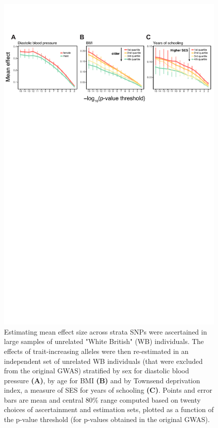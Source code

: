 \documentclass[hidelinks, 12pt]{article}
\begin{document}
\begin{figure}[h]
\centering
\includegraphics[width=\textwidth]{./supp_figures/beta_sweep.pdf}
\caption[Estimating mean effect size across strata]{\small Estimating mean effect size across strata   SNPs were ascertained in large samples of unrelated "White British" (WB) individuals. The effects of trait-increasing alleles were then re-estimated in an independent set of unrelated WB individuals (that were excluded from the original GWAS) stratified by sex for diastolic blood pressure {\bf (A)}, by age for BMI {\bf (B)} and by Townsend deprivation index, a measure of SES for years of schooling {\bf (C)}. Points and error bars are mean and central 80\% range computed based on twenty choices of ascertainment and estimation sets, plotted as a function of the p-value threshold (for p-values obtained in the original GWAS).}
\label{fig_p_value_trends}
\end{figure}
\end{document}
